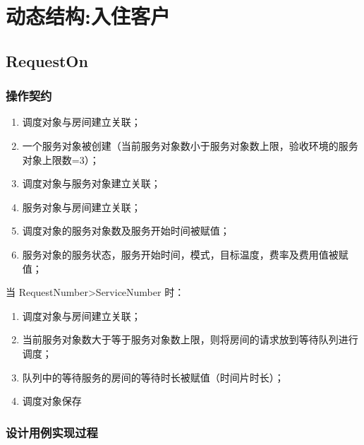 \documentclass[black,normal,cn]{elegantnote}
\begin{document}
\section{动态结构:入住客户}
\subsection{RequestOn}
\subsubsection{操作契约}

\begin{enumerate}[leftmargin=3em, listparindent=4em, parsep=0pt]
    \item 调度对象与房间建立关联；
    \item 一个服务对象被创建（当前服务对象数小于服务对象数上限，验收环境的服务对象上限数=3）；
    \item 调度对象与服务对象建立关联；
    \item 服务对象与房间建立关联；
    \item 调度对象的服务对象数及服务开始时间被赋值；
    \item 服务对象的服务状态，服务开始时间，模式，目标温度，费率及费用值被赋值；
\end{enumerate}

\noindent 当 RequestNumber>ServiceNumber 时：

\begin{enumerate}[leftmargin=3em, listparindent=4em, parsep=0pt]
    \item 调度对象与房间建立关联；
    \item 当前服务对象数大于等于服务对象数上限，则将房间的请求放到等待队列进行调度；
    \item 队列中的等待服务的房间的等待时长被赋值（时间片时长）；
    \item 调度对象保存
\end{enumerate}

\subsubsection{设计用例实现过程}
\end{document}
